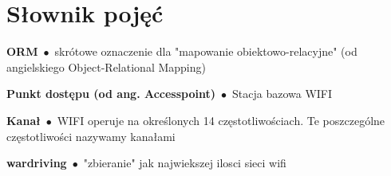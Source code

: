 \chapter*{Słownik pojęć}

\newcommand{\entry}[2]{\textbf{#1}\ $\bullet$\ {#2}}

\entry{ORM}{skrótowe oznaczenie dla "mapowanie obiektowo-relacyjne" (od angielskiego Object-Relational Mapping)}

\entry{Punkt dostępu (od ang. Accesspoint)}{Stacja bazowa WIFI}

\entry{Kanał}{WIFI operuje na określonych 14 częstotliwościach. Te poszczególne częstotliwości nazywamy kanałami}

\entry{wardriving}{"zbieranie" jak najwiekszej ilosci sieci wifi}

